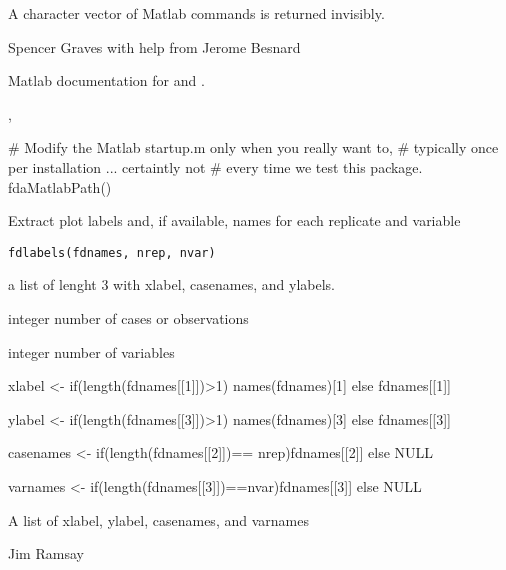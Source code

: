 \documentclass{article}
\begin{document}
\begin{Value}
A character vector of Matlab  commands is returned
invisibly.
\end{Value}
\begin{Author}\relax
Spencer Graves with help from Jerome Besnard
\end{Author}
\begin{References}\relax
Matlab documentation for  and .
\end{References}
\begin{SeeAlso}\relax
{},
\end{SeeAlso}
\begin{Examples}
\begin{ExampleCode}
# Modify the Matlab startup.m only when you really want to,
# typically once per installation ... certaintly not
# every time we test this package.
fdaMatlabPath()
\end{ExampleCode}
\end{Examples}

\begin{Description}\relax
Extract plot labels and, if available, names for each replicate and
variable
\end{Description}
\begin{Usage}
\begin{verbatim}
fdlabels(fdnames, nrep, nvar) 
\end{verbatim}
\end{Usage}
\begin{Arguments}
\begin{ldescription}
\item[\code{fdnames}] a list of lenght 3 with xlabel, casenames, and ylabels.  

\item[\code{nrep}] integer number of cases or observations 
\item[\code{nvar}] integer number of variables 
\end{ldescription}
\end{Arguments}
\begin{Details}\relax
xlabel <- if(length(fdnames[[1]])>1) names(fdnames)[1] else 
fdnames[[1]] 

ylabel <- if(length(fdnames[[3]])>1) names(fdnames)[3] else
fdnames[[3]] 

casenames <- if(length(fdnames[[2]])== nrep)fdnames[[2]] else NULL

varnames <- if(length(fdnames[[3]])==nvar)fdnames[[3]] else NULL
\end{Details}
\begin{Value}
A list of xlabel, ylabel, casenames, and varnames
\end{Value}
\begin{Author}\relax
Jim Ramsay
\end{Author}
\begin{SeeAlso}\relax
{}
\end{SeeAlso}
\end{document}
